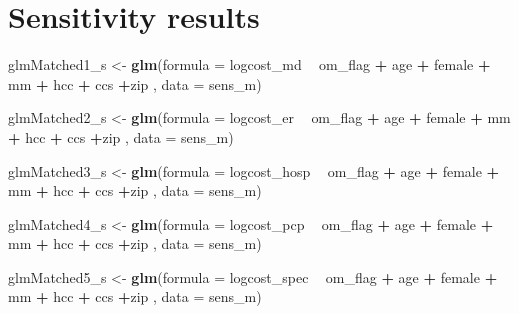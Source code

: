 \documentclass[]{article}
\newenvironment{Shaded}{\begin{snugshade}}{\end{snugshade}}
\newcommand{\KeywordTok}[1]{\textcolor[rgb]{0.13,0.29,0.53}{\textbf{#1}}}
\newcommand{\DataTypeTok}[1]{\textcolor[rgb]{0.13,0.29,0.53}{#1}}
\newcommand{\StringTok}[1]{\textcolor[rgb]{0.31,0.60,0.02}{#1}}
\newcommand{\OperatorTok}[1]{\textcolor[rgb]{0.81,0.36,0.00}{\textbf{#1}}}
\newcommand{\NormalTok}[1]{#1}
\begin{document}
\section{Sensitivity results}\label{sensitivity-results}

\begin{Shaded}
\begin{Highlighting}[]
\NormalTok{glmMatched1_s <-}\StringTok{ }\KeywordTok{glm}\NormalTok{(}\DataTypeTok{formula =}\NormalTok{ logcost_md }\OperatorTok{~}\StringTok{ }\NormalTok{om_flag }\OperatorTok{+}\StringTok{ }\NormalTok{age }\OperatorTok{+}\StringTok{ }\NormalTok{female }\OperatorTok{+}\StringTok{ }\NormalTok{mm }\OperatorTok{+}\StringTok{ }\NormalTok{hcc }\OperatorTok{+}\StringTok{ }\NormalTok{ccs }\OperatorTok{+}\NormalTok{zip ,}
                   \DataTypeTok{data    =}\NormalTok{ sens_m)}

\NormalTok{glmMatched2_s <-}\StringTok{ }\KeywordTok{glm}\NormalTok{(}\DataTypeTok{formula =}\NormalTok{ logcost_er }\OperatorTok{~}\StringTok{ }\NormalTok{om_flag }\OperatorTok{+}\StringTok{ }\NormalTok{age }\OperatorTok{+}\StringTok{ }\NormalTok{female }\OperatorTok{+}\StringTok{ }\NormalTok{mm }\OperatorTok{+}\StringTok{ }\NormalTok{hcc }\OperatorTok{+}\StringTok{ }\NormalTok{ccs }\OperatorTok{+}\NormalTok{zip ,}
                   \DataTypeTok{data    =}\NormalTok{ sens_m)}

\NormalTok{glmMatched3_s <-}\StringTok{ }\KeywordTok{glm}\NormalTok{(}\DataTypeTok{formula =}\NormalTok{ logcost_hosp }\OperatorTok{~}\StringTok{ }\NormalTok{om_flag }\OperatorTok{+}\StringTok{ }\NormalTok{age }\OperatorTok{+}\StringTok{ }\NormalTok{female }\OperatorTok{+}\StringTok{ }\NormalTok{mm }\OperatorTok{+}\StringTok{ }\NormalTok{hcc }\OperatorTok{+}\StringTok{ }\NormalTok{ccs }\OperatorTok{+}\NormalTok{zip ,}
                   \DataTypeTok{data    =}\NormalTok{ sens_m)}

\NormalTok{glmMatched4_s <-}\StringTok{ }\KeywordTok{glm}\NormalTok{(}\DataTypeTok{formula =}\NormalTok{ logcost_pcp }\OperatorTok{~}\StringTok{ }\NormalTok{om_flag }\OperatorTok{+}\StringTok{ }\NormalTok{age }\OperatorTok{+}\StringTok{ }\NormalTok{female }\OperatorTok{+}\StringTok{ }\NormalTok{mm }\OperatorTok{+}\StringTok{ }\NormalTok{hcc }\OperatorTok{+}\StringTok{ }\NormalTok{ccs }\OperatorTok{+}\NormalTok{zip ,}
                   \DataTypeTok{data    =}\NormalTok{ sens_m)}

\NormalTok{glmMatched5_s <-}\StringTok{ }\KeywordTok{glm}\NormalTok{(}\DataTypeTok{formula =}\NormalTok{ logcost_spec }\OperatorTok{~}\StringTok{ }\NormalTok{om_flag }\OperatorTok{+}\StringTok{ }\NormalTok{age }\OperatorTok{+}\StringTok{ }\NormalTok{female }\OperatorTok{+}\StringTok{ }\NormalTok{mm }\OperatorTok{+}\StringTok{ }\NormalTok{hcc }\OperatorTok{+}\StringTok{ }\NormalTok{ccs }\OperatorTok{+}\NormalTok{zip ,}
                   \DataTypeTok{data    =}\NormalTok{ sens_m)}



\end{Highlighting}
\end{Shaded}
\end{document}
